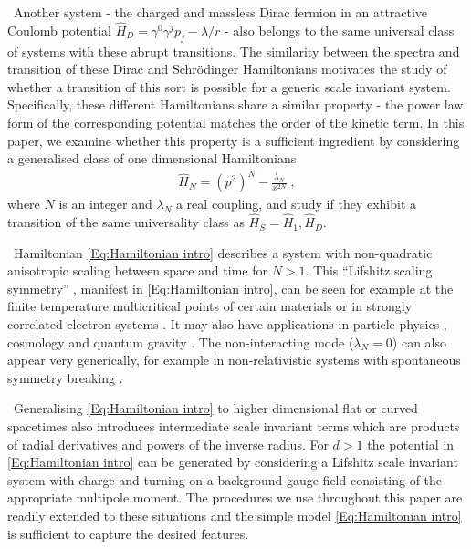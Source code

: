\documentclass[aps,prl,reprint,preprintnumbers]{revtex4-1}
\begin{document}
{\ Another system - the charged and massless Dirac fermion in an attractive Coulomb potential $\hat{H}_D = \gamma^0 \gamma^j p_j - \lambda/r$ \cite{OvdatMaoJiangEtAl2017} - also belongs to the same universal class of systems with these abrupt transitions. The similarity between the spectra and transition of these Dirac and Schr\"{o}dinger Hamiltonians motivates the study of whether a transition of this sort is possible for a generic scale invariant system. Specifically, these different Hamiltonians share a similar property -  the power law form of the corresponding potential matches the order of the kinetic term. In this paper, we examine whether this property is a sufficient ingredient by considering a generalised class of one dimensional Hamiltonians
  \begin{eqnarray}
    \label{Eq:Hamiltonian intro}
    \hat{H}_{N} = (p^{2})^{N} - \frac{\lambda_{N}}{x^{2N}} \; , 
  \end{eqnarray}
where $N$ is an integer and $\lambda_{N}$ a real coupling, and study if they exhibit a transition of the same universality class as $\hat{H}_{S}=\hat{H}_{1}, \hat{H}_{D}$.}

{\ Hamiltonian \eqref{Eq:Hamiltonian intro} describes a system with non-quadratic anisotropic scaling between space and time for $N>1$. This ``Lifshitz scaling symmetry'' \cite{Alexandre:2011kr}, manifest in \eqref{Eq:Hamiltonian intro}, can be seen for example at the finite temperature multicritical points of certain materials \cite{PhysRevLett.35.1678,PhysRevB.23.4615} or in strongly correlated electron systems \cite{PhysRevB.69.224415,PhysRevB.69.224416,Ardonne:2003wa}. It may also have applications in particle physics \cite{Alexandre:2011kr}, cosmology \cite{Mukohyama:2010xz} and quantum gravity \cite{PhysRevD.57.971,Kachru:2008yh,Horava:2009if,Horava:2009uw,Gies:2016con}. The non-interacting mode ($\lambda_{N}=0$) can also appear very generically, for example in non-relativistic systems with spontaneous symmetry breaking \cite{Brauner:2010wm}.}

{\ Generalising \eqref{Eq:Hamiltonian intro} to higher dimensional flat or curved spacetimes also introduces intermediate scale invariant terms which are products of radial derivatives and powers of the inverse radius. For $d>1$ the potential in \eqref{Eq:Hamiltonian intro} can be generated by considering a Lifshitz scale invariant system with charge and turning on a background gauge field \cite{Horava:2008jf,Das:2009fb,Alexandre:2011kr,Farias:2011aa} consisting of the appropriate multipole moment. The procedures we use throughout this paper are readily extended to these situations and the simple model \eqref{Eq:Hamiltonian intro} is sufficient to capture the desired features.}
\end{document}
